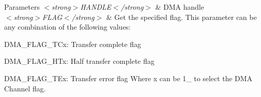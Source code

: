 \begin{DoxyParams}{Parameters}
{\em $<$strong$>$\-H\-A\-N\-D\-L\-E$<$/strong$>$} & D\-M\-A handle \\
\hline
{\em $<$strong$>$\-F\-L\-A\-G$<$/strong$>$} & Get the specified flag. This parameter can be any combination of the following values\-: \begin{DoxyItemize}
\item D\-M\-A\-\_\-\-F\-L\-A\-G\-\_\-\-T\-Cx\-: Transfer complete flag \item D\-M\-A\-\_\-\-F\-L\-A\-G\-\_\-\-H\-Tx\-: Half transfer complete flag \item D\-M\-A\-\_\-\-F\-L\-A\-G\-\_\-\-T\-Ex\-: Transfer error flag Where x can be 1\-\_ to select the D\-M\-A Channel flag. \end{DoxyItemize}
\\
\hline
\end{DoxyParams}

